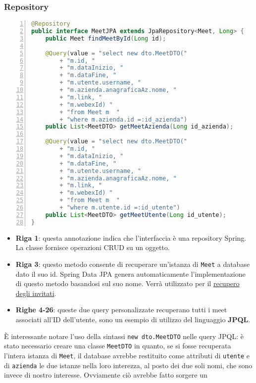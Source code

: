 \subsubsection{Repository}
\begin{lstlisting}[language=java, frame=lines, basicstyle=\ttfamily\scriptsize, numbers=left]
@Repository
public interface MeetJPA extends JpaRepository<Meet, Long> {
    public Meet findMeetById(Long id);

    @Query(value = "select new dto.MeetDTO("
        + "m.id, "
        + "m.dataInizio, "
        + "m.dataFine, "
        + "m.utente.username, "
        + "m.azienda.anagraficaAz.nome, "
        + "m.link, "
        + "m.webexId) "
        + "from Meet m  "
        + "where m.azienda.id =:id_azienda")
    public List<MeetDTO> getMeetAzienda(Long id_azienda);
    
    @Query(value = "select new dto.MeetDTO("
        + "m.id, "
        + "m.dataInizio, "
        + "m.dataFine, "
        + "m.utente.username, "
        + "m.azienda.anagraficaAz.nome, "
        + "m.link, "
        + "m.webexId) "
        + "from Meet m  "
        + "where m.utente.id =:id_utente")
    public List<MeetDTO> getMeetUtente(Long id_utente);
}
\end{lstlisting}
\begin{itemize}
    \item \textbf{Riga 1}: questa annotazione indica che l'interfaccia è una repository Spring. La classe fornisce operazioni CRUD su un oggetto. 
    \cite{RepositorySpring}

    \item \textbf{Riga 3}: questo metodo consente di recuperare un'istanza di \texttt{Meet} a database dato il suo id. Spring Data JPA
    genera automaticamente l'implementazione di questo metodo basandosi sul suo nome. Verrà utilizzato per il 
    \hyperref[sec:recupero_invitati_backend]{recupero degli invitati}.

    \item \textbf{Righe 4-26}: queste due query personalizzate recuperano tutti i meet associati all'ID dell'utente, sono un esempio di utilizzo
    del linguaggio \textbf{JPQL}. 
\end{itemize}
È interessante notare l'uso della sintassi \texttt{new dto.MeetDTO} nelle query JPQL: è stato necessario creare una classe \texttt{MeetDTO} in quanto, 
se si fosse recuperata l'intera istanza di \texttt{Meet}, il database avrebbe restituito come attributi di \texttt{utente} e di \texttt{azienda} le 
due istanze nella loro interezza, al posto dei due soli nomi, che sono invece di nostro interesse. Ovviamente ciò avrebbe fatto sorgere un 
